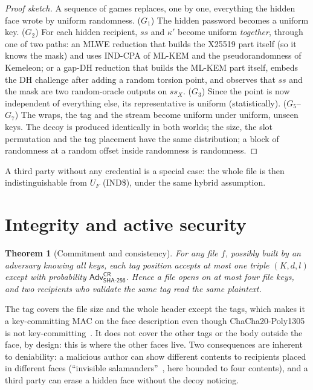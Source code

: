 \documentclass[11pt,a4paper]{article}
\newtheorem{theorem}{Theorem}
\theoremstyle{definition}
\theoremstyle{remark}
\newcommand{\Adv}{\mathsf{Adv}}
\begin{document}
\begin{proof}[Proof sketch]
A sequence of games replaces, one by one, everything the hidden face wrote by uniform randomness. ($G_1$) The hidden password becomes a uniform key. ($G_2$) For each hidden recipient, $ss$ and $\kappa'$ become uniform \emph{together}, through one of two paths: an MLWE reduction that builds the X25519 part itself (so it knows the mask) and uses IND-CPA of ML-KEM and the pseudorandomness of Kemeleon; or a gap-DH reduction that builds the ML-KEM part itself, embeds the DH challenge after adding a random torsion point, and observes that $ss$ and the mask are two random-oracle outputs on $ss_X$. ($G_3$) Since the point is now independent of everything else, its representative is uniform (statistically). ($G_5$--$G_7$) The wraps, the tag and the stream become uniform under uniform, unseen keys. The decoy is produced identically in both worlds; the size, the slot permutation and the tag placement have the same distribution; a block of randomness at a random offset inside randomness is randomness.
\end{proof}

A third party without any credential is a special case: the whole file is then indistinguishable from $U_F$ (IND\$), under the same hybrid assumption.

\section{Integrity and active security}
\label{sec:int}

\begin{theorem}[Commitment and consistency]
For any file $f$, possibly built by an adversary knowing all keys, each tag position accepts at most one triple $(K,d,l)$ except with probability $\Adv^{\mathsf{CR}}_{\mathsf{SHA\text{-}256}}$. Hence a file opens on at most four file keys, and two recipients who validate the same tag read the same plaintext.
\end{theorem}

The tag covers the file size and the whole header except the tags, which makes it a key-committing MAC on the face description even though ChaCha20-Poly1305 is not key-committing~\cite{salamanders,keycommit}. It does not cover the other tags or the body outside the face, by design: this is where the other faces live. Two consequences are inherent to deniability: a malicious author can show different contents to recipients placed in different faces (``invisible salamanders''~\cite{salamanders}, here bounded to four contents), and a third party can erase a hidden face without the decoy noticing.
\end{document}
